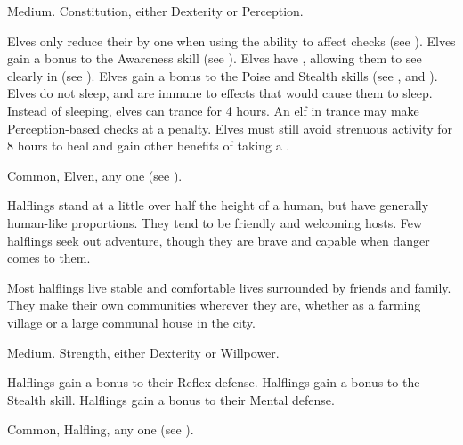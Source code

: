    Medium.
    Constitution, either  Dexterity or  Perception.
  \begin{raggeditemize}
     Elves only reduce their  by one when using the  ability to affect checks (see ).
     Elves gain a  bonus to the Awareness skill (see ).
     Elves have , allowing them to see clearly in  (see ).
     Elves gain a  bonus to the Poise and Stealth skills (see , and ).
     Elves do not sleep, and are immune to \magical effects that would cause them to sleep.
      Instead of sleeping, elves can trance for 4 hours.
      An elf in trance may make Perception-based checks at a  penalty.
      Elves must still avoid strenuous activity for 8 hours to heal and gain other benefits of taking a .
  \end{raggeditemize}
   Common, Elven, any one  (see ).


  Halflings stand at a little over half the height of a human, but have generally human-like proportions.
  They tend to be friendly and welcoming hosts.
  Few halflings seek out adventure, though they are brave and capable when danger comes to them.

  Most halflings live stable and comfortable lives surrounded by friends and family.
  They make their own communities wherever they are, whether as a farming village or a large communal house in the city.

   Medium.
    Strength, either  Dexterity or  Willpower.
  \begin{raggeditemize}
     Halflings gain a  bonus to their Reflex defense.
     Halflings gain a  bonus to the Stealth skill.
     Halflings gain a  bonus to their Mental defense.
  \end{raggeditemize}
   Common, Halfling, any one  (see ).


